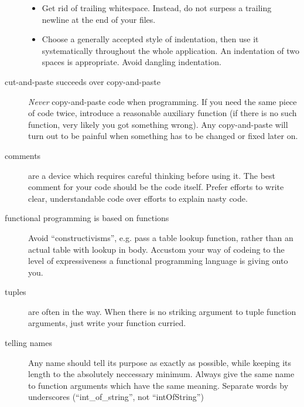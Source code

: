 \begin{isabellebody}
\begin{isamarkuptext}
\begin{description}
\begin{itemize}
        \item Get rid of trailing whitespace.  Instead, do not
          surpess a trailing newline at the end of your files.

        \item Choose a generally accepted style of indentation,
          then use it systematically throughout the whole
          application.  An indentation of two spaces is appropriate.
          Avoid dangling indentation.

      \end{itemize}

    \item[cut-and-paste succeeds over copy-and-paste]
      \emph{Never} copy-and-paste code when programming.  If you
        need the same piece of code twice, introduce a
        reasonable auxiliary function (if there is no
        such function, very likely you got something wrong).
        Any copy-and-paste will turn out to be painful 
        when something has to be changed or fixed later on.

    \item[comments]
      are a device which requires careful thinking before using
      it.  The best comment for your code should be the code itself.
      Prefer efforts to write clear, understandable code
      over efforts to explain nasty code.

    \item[functional programming is based on functions]
      Avoid ``constructivisms'', e.g. pass a table lookup function,
      rather than an actual table with lookup in body.  Accustom
      your way of codeing to the level of expressiveness
      a functional programming language is giving onto you.

    \item[tuples]
      are often in the way.  When there is no striking argument
      to tuple function arguments, just write your function curried.

    \item[telling names]
      Any name should tell its purpose as exactly as possible,
      while keeping its length to the absolutely neccessary minimum.
      Always give the same name to function arguments which
      have the same meaning. Separate words by underscores
      (``{\ttfamily int\_of\_string}'', not ``{\ttfamily intOfString}'')


\end{description}
\end{isamarkuptext}
\end{isabellebody}
